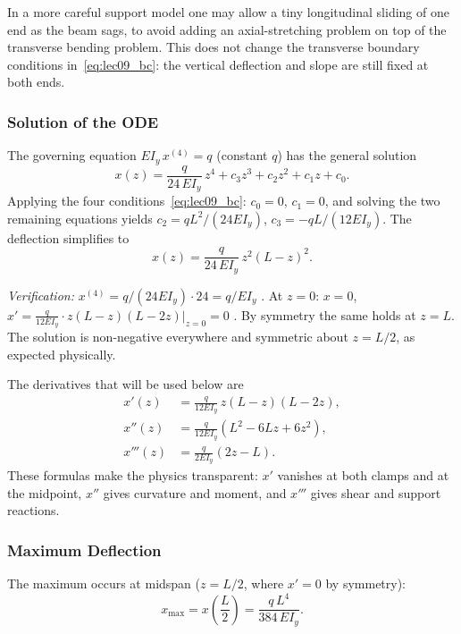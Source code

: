 \documentclass[../main.tex]{subfiles}
\begin{document}
In a more careful support model one may allow a tiny longitudinal sliding of one end as the beam sags, to avoid adding an axial-stretching problem on top of the transverse bending problem. This does not change the transverse boundary conditions in~\eqref{eq:lec09_bc}: the vertical deflection and slope are still fixed at both ends.

\subsubsection*{Solution of the ODE}

The governing equation $EI_y\,x^{(4)}=q$ (constant $q$) has the general solution
\[
  x(z) = \frac{q}{24\,EI_y}\,z^4 + c_3 z^3 + c_2 z^2 + c_1 z + c_0.
\]
Applying the four conditions~\eqref{eq:lec09_bc}: $c_0=0$, $c_1=0$, and solving the two remaining equations yields $c_2=qL^2/(24EI_y)$, $c_3=-qL/(12EI_y)$. The deflection simplifies to
\begin{equation}
  \boxed{x(z) = \frac{q}{24\,EI_y}\,z^2(L-z)^2.}
  \label{eq:lec09_sol}
\end{equation}

\textit{Verification:} $x^{(4)} = q/(24EI_y)\cdot 24 = q/EI_y$ \checkmark. At $z=0$: $x=0$, $x'= \frac{q}{12EI_y}\cdot z(L-z)(L-2z)\big|_{z=0}=0$ \checkmark. By symmetry the same holds at $z=L$. The solution is non-negative everywhere and symmetric about $z=L/2$, as expected physically.

The derivatives that will be used below are
\begin{align}
  x'(z)
    &= \frac{q}{12EI_y}\,z(L-z)(L-2z),
    \label{eq:lec09_xprime}\\
  x''(z)
    &= \frac{q}{12EI_y}\left(L^2-6Lz+6z^2\right),
    \label{eq:lec09_xdoubleprime}\\
  x'''(z)
    &= \frac{q}{2EI_y}\left(2z-L\right).
    \label{eq:lec09_xtripleprime}
\end{align}
These formulas make the physics transparent: $x'$ vanishes at both clamps and at the midpoint, $x''$ gives curvature and moment, and $x'''$ gives shear and support reactions.

\subsubsection*{Maximum Deflection}

The maximum occurs at midspan ($z=L/2$, where $x'=0$ by symmetry):
\begin{equation}
  \boxed{x_{\max} = x\!\left(\frac{L}{2}\right) = \frac{q\,L^4}{384\,EI_y}.}
  \label{eq:lec09_xmax}
\end{equation}
\end{document}
